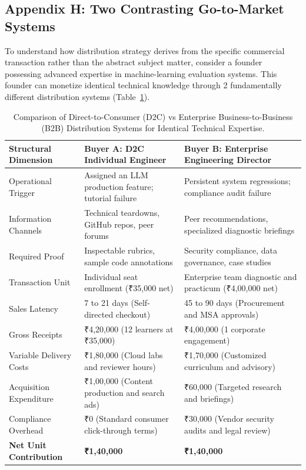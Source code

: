 \subsection*{Appendix H: Two Contrasting Go-to-Market Systems}

To understand how distribution strategy derives from the specific commercial transaction rather than the abstract subject matter, consider a founder possessing advanced expertise in machine-learning evaluation systems. This founder can monetize identical technical knowledge through 2 fundamentally different distribution systems (Table~\ref{tab:gtm_comparison}).

\begin{table}[t]
\centering
\small
\caption{Comparison of Direct-to-Consumer (D2C) vs Enterprise Business-to-Business (B2B) Distribution Systems for Identical Technical Expertise.}
\label{tab:gtm_comparison}
\begin{tabular}{p{3.5cm}p{6.0cm}p{6.0cm}}
\hline\hline
\textbf{Structural Dimension} & \textbf{Buyer A: D2C Individual Engineer} & \textbf{Buyer B: Enterprise Engineering Director} \\
\hline
Operational Trigger & Assigned an LLM production feature; tutorial failure & Persistent system regressions; compliance audit failure \\
Information Channels & Technical teardowns, GitHub repos, peer forums & Peer recommendations, specialized diagnostic briefings \\
Required Proof & Inspectable rubrics, sample code annotations & Security compliance, data governance, case studies \\
Transaction Unit & Individual seat enrollment (₹35,000 net) & Enterprise team diagnostic and practicum (₹4,00,000 net) \\
Sales Latency & 7 to 21 days (Self-directed checkout) & 45 to 90 days (Procurement and MSA approvals) \\
Gross Receipts & ₹4,20,000 (12 learners at ₹35,000) & ₹4,00,000 (1 corporate engagement) \\
Variable Delivery Costs & ₹1,80,000 (Cloud labs and reviewer hours) & ₹1,70,000 (Customized curriculum and advisory) \\
Acquisition Expenditure & ₹1,00,000 (Content production and search ads) & ₹60,000 (Targeted research and briefings) \\
Compliance Overhead & ₹0 (Standard consumer click-through terms) & ₹30,000 (Vendor security audits and legal review) \\
\hline
\textbf{Net Unit Contribution} & \textbf{₹1,40,000} & \textbf{₹1,40,000} \\
\hline\hline
\end{tabular}
\end{table}

